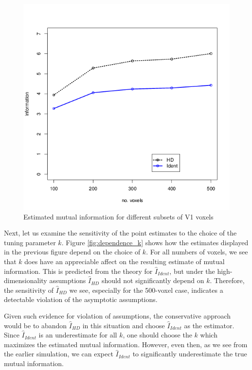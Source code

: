 \begin{figure}
\centering
\includegraphics[scale = 0.5]{../../Yuval/info_infer_edited.png}
\caption{Estimated mutual information for different subsets of V1 voxels}
\label{fig:n_voxels_vs_mi}
\end{figure}

Next, let us examine the sensitivity of the point estimates to the
choice of the tuning parameter $k$.  Figure \ref{fig:dependence_k}
shows how the estimates displayed in the previous figure depend on the
choice of $k$.  For all numbers of voxels, we see that $k$ does have
an appreciable affect on the resulting estimate of mutual information.
This is predicted from the theory for $\hat{I}_{Ident}$, but under the
high-dimensionality assumptions $\hat{I}_{HD}$ should not
significantly depend on $k$.  Therefore, the sensitivity of
$\hat{I}_{HD}$ we see, especially for the 500-voxel case, indicates a
detectable violation of the asymptotic assumptions.

Given such evidence for violation of assumptions, the conservative
approach would be to abandon $\hat{I}_{HD}$ in this situation and
choose $\hat{I}_{Ident}$ as the estimator. Since $\hat{I}_{Ident}$ is
an underestimate for all $k$, one should choose the $k$ which
maximizes the estimated mutual information.  However, even then, as we
see from the earlier simulation, we can expect $\hat{I}_{Ident}$ to
significantly underestimate the true mutual information.

